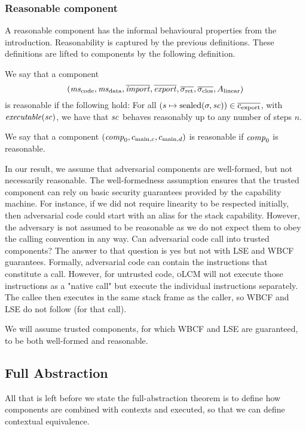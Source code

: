 \documentclass{jfp}
\newcommand{\srccm}{\textsc{oLCM}}
\newenvironment{jversion}{}{}
\begin{document}
\begin{jversion}
  \subsubsection{Reasonable component}
  A reasonable component has the informal behavioural properties from the introduction.
  Reasonability is captured by the previous definitions. These definitions are lifted to components by the following definition.
  \begin{definition}
    \label{def:reasonable-component}
    We say that a component
    \[
      (\mscode,\msdata,\overline{\var{import}},\overline{\var{export}},\sigrets,\sigcloss,A_\linear)
    \]
    is reasonable if the following hold: For all $(s \mapsto \mathrm{sealed}(\sigma,\mathit{sc})) \in
    \overline{c_{\mathrm{export}}}$, with $\exec{\vsc}$, we have that $\mathit{sc}$
    behaves reasonably up to any number of steps $n$.

    We say that a component
    $(\mathit{comp}_0,c_{\mathrm{main},c}, c_{\mathrm{main},d})$ is reasonable if $\mathit{comp}_0$ is reasonable.
  \end{definition}
\end{jversion}

In our result, we assume that adversarial components are well-formed, but not necessarily reasonable. The well-formedness assumption ensures
that the trusted component can rely on basic security guarantees provided by the capability machine. For instance, if we did not require linearity to be respected initially, then adversarial code could start with an alias for the stack capability.
However, the adversary is not assumed to be reasonable as we do not expect them to obey the calling convention in any way.
Can adversarial code call into trusted components?
The answer to that question is yes but not with LSE and WBCF guarantees.
Formally, adversarial code can contain the instructions that constitute a call.
However, for untrusted code, \srccm{} will not execute those instructions as a "native call" but execute the individual instructions separately.
The callee then executes in the same stack frame as the caller, so WBCF and LSE do not follow (for that call).

We will assume trusted components, for which WBCF and LSE are guaranteed, to be both well-formed and reasonable. 

\subsection{Full Abstraction}
All that is left before we state the full-abstraction theorem is to define how components are combined with contexts and executed, so that we can define contextual equivalence.
\end{document}
